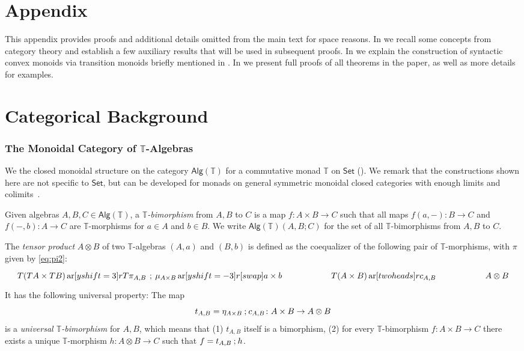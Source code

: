 \documentclass[a4paper, UKenglish, numberwithinsect, thm-restate, cleveref, final]{lipics-v2021}
\theoremstyle{plain}
\theoremstyle{definition}
\newcommand{\T}{\ensuremath{\mathbb{T}}\xspace}
\newcommand{\seq}{\ensuremath{\mathbin{\text{\upshape;}}}}
\newcommand{\Alg}{\ensuremath{\mathsf{Alg}}}
\newcommand{\Set}{\ensuremath{\mathsf{Set}}\xspace}
\DeclareMathOperator{\ar}{ar}
\numberwithin{equation}{section}
\begin{document}


\clearpage
\appendix 

\section*{Appendix}

This appendix provides proofs and additional details omitted from the main text for space reasons. In  we recall some concepts from category theory and establish a few auxiliary results that will be used in subsequent proofs. In  we explain the construction of syntactic convex monoids via transition monoids briefly mentioned in . In  we present full proofs of all theorems in the paper, as well as more details for examples.


\section{Categorical Background}\label{app:cats}

\subsubsection*{The Monoidal Category of $\T$-Algebras}
We the closed monoidal structure on the category $\Alg(\T)$ for a commutative monad $\T$ on $\Set$ (). We remark that the constructions shown here are not specific to $\Set$, but can be developed for monads on general symmetric monoidal closed categories with enough limits and colimits~\cite{kock-71a,kock-72,seal-2012}.

Given algebras $A,B,C\in \Alg(\T)$, a \emph{$\T$-bimorphism} from $A,B$ to $C$ is a map $f\colon A\times B\to C$ such that all maps $f(a,-)\colon B\to C$ and $f(-, b) \colon A \rightarrow C$ are $\T$-morphisms for $a\in A$ and $b \in B$. We write  $\Alg(\T)(A,B;C)$ for the set of all $\T$-bimorphisms from $A,B$ to $C$.

The \emph{tensor product} $A\otimes B$ of two $\T$-algebras $(A, a)$ and $(B, b)$ is defined as the coequalizer of the following pair of $\T$-morphisms, with $\pi$ given by \eqref{eq:pi2}:
\[
  \begin{tikzcd}[column sep = 50]
    T(TA \times TB)
    \ar[yshift=3]{r}{T \pi_{A,B}\,\seq\, \mu_{A\times B}}
    \ar[yshift=-3]{r}[swap]{a \times b}
    &
    T(A \times B) \ar[two heads]{r}{c_{A,B}} & A\otimes B
  \end{tikzcd}
\]
It has the following universal property: The map
\[t_{A,B} = \eta_{A\times B}\seq c_{A,B}\colon A\times B\to A\otimes B\]
is a \emph{universal $\T$-bimorphism} for \(A, B\), which means that (1) \(t_{A, B}\) itself is a bimorphism, (2) for every $\T$-bimorphism $f\colon A\times B\to C$ there exists a unique $\T$-morphism $h\colon A\otimes B\to C$ such that $f=t_{A,B}\seq h$.
\end{document}
